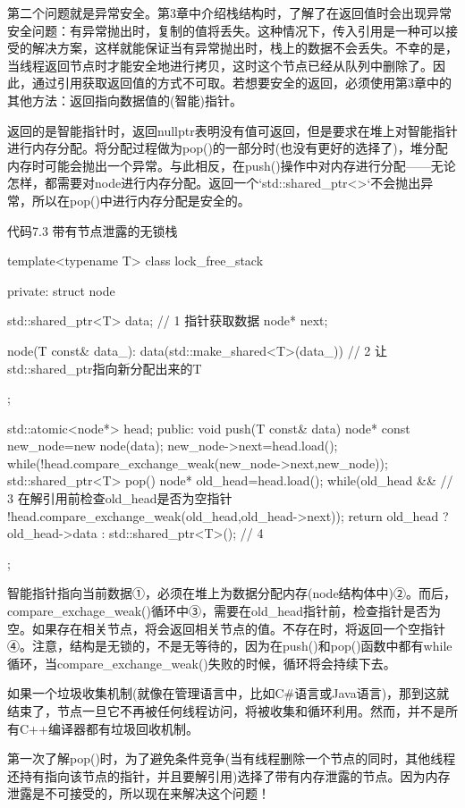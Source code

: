 第二个问题就是异常安全。第3章中介绍栈结构时，了解了在返回值时会出现异常安全问题：有异常抛出时，复制的值将丢失。这种情况下，传入引用是一种可以接受的解决方案，这样就能保证当有异常抛出时，栈上的数据不会丢失。不幸的是， 当线程返回节点时才能安全地进行拷贝，这时这个节点已经从队列中删除了。因此，通过引用获取返回值的方式不可取。若想要安全的返回，必须使用第3章中的其他方法：返回指向数据值的(智能)指针。

返回的是智能指针时，返回nullptr表明没有值可返回，但是要求在堆上对智能指针进行内存分配。将分配过程做为pop()的一部分时(也没有更好的选择了)，堆分配内存时可能会抛出一个异常。与此相反，在push()操作中对内存进行分配——无论怎样，都需要对node进行内存分配。返回一个`std::shared\_ptr<>`不会抛出异常，所以在pop()中进行内存分配是安全的。

代码7.3 带有节点泄露的无锁栈

\begin{cpp}
template<typename T>
class lock_free_stack
{
private:
  struct node
  {
    std::shared_ptr<T> data;  // 1 指针获取数据
    node* next;

    node(T const& data_):
      data(std::make_shared<T>(data_))  // 2 让std::shared_ptr指向新分配出来的T
    {}
  };

  std::atomic<node*> head;
public:
  void push(T const& data)
  {
    node* const new_node=new node(data);
    new_node->next=head.load();
    while(!head.compare_exchange_weak(new_node->next,new_node));
  }
  std::shared_ptr<T> pop()
  {
    node* old_head=head.load();
    while(old_head && // 3 在解引用前检查old_head是否为空指针
      !head.compare_exchange_weak(old_head,old_head->next));
    return old_head ? old_head->data : std::shared_ptr<T>();  // 4
  }
};
\end{cpp}

智能指针指向当前数据①，必须在堆上为数据分配内存(node结构体中)②。而后，compare\_exchage\_weak()循环中③，需要在old\_head指针前，检查指针是否为空。如果存在相关节点，将会返回相关节点的值。不存在时，将返回一个空指针④。注意，结构是无锁的，不是无等待的，因为在push()和pop()函数中都有while循环，当compare\_exchange\_weak()失败的时候，循环将会持续下去。

如果一个垃圾收集机制(就像在管理语言中，比如C#语言或Java语言)，那到这就结束了，节点一旦它不再被任何线程访问，将被收集和循环利用。然而，并不是所有C++编译器都有垃圾回收机制。


第一次了解pop()时，为了避免条件竞争(当有线程删除一个节点的同时，其他线程还持有指向该节点的指针，并且要解引用)选择了带有内存泄露的节点。因为内存泄露是不可接受的，所以现在来解决这个问题！

